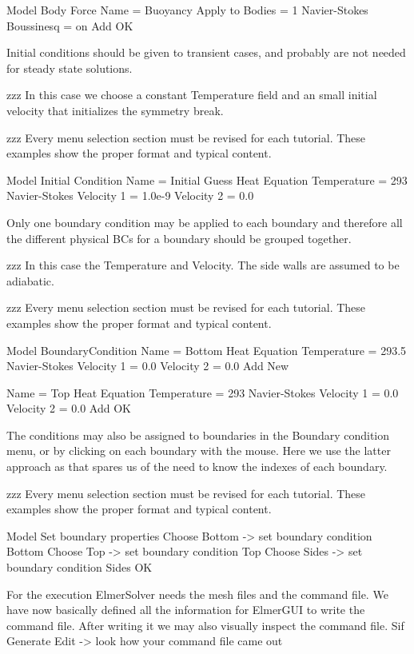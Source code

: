\ttbegin
Model
  Body Force
    Name = Buoyancy
    Apply to Bodies = 1
    Navier-Stokes
      Boussinesq = on
    Add 
    OK
\ttend    

Initial conditions should be given to transient cases, and probably are not needed for steady state solutions. 

zzz In this case we choose a constant Temperature field and an small initial velocity that initializes the symmetry break. 

zzz Every menu selection section must be revised for each tutorial.  These examples show the proper format and typical content.

\ttbegin
Model
  Initial Condition 
    Name = Initial Guess
    Heat Equation
      Temperature = 293
    Navier-Stokes
      Velocity 1 = 1.0e-9
      Velocity 2 = 0.0
\ttend

Only one boundary condition may be applied to each boundary and therefore all the different physical BCs for a boundary should be grouped together. 

zzz In this case the Temperature and Velocity. The side walls are assumed to be adiabatic.

zzz Every menu selection section must be revised for each tutorial.  These examples show the proper format and typical content.

\ttbegin
Model
  BoundaryCondition
    Name = Bottom
    Heat Equation
      Temperature = 293.5
    Navier-Stokes 
      Velocity 1 = 0.0
      Velocity 2 = 0.0
    Add
    New

    Name = Top
    Heat Equation
      Temperature = 293
    Navier-Stokes 
      Velocity 1 = 0.0
      Velocity 2 = 0.0
    Add
   OK 
\ttend   

The conditions may also be assigned to boundaries in the Boundary condition menu, or by clicking on each boundary with the mouse. Here we use the latter approach as that spares us of the need to know the indexes of each boundary.

zzz Every menu selection section must be revised for each tutorial.  These examples show the proper format and typical content.

\ttbegin
Model
  Set boundary properties
    Choose Bottom -> set boundary condition Bottom
    Choose Top -> set boundary condition Top
    Choose Sides -> set boundary condition Sides
   OK 
\ttend

For the execution ElmerSolver needs the mesh files and the command file.  We have now basically defined all the information for ElmerGUI to write the command file. After writing it we may also visually inspect the command file.
\ttbegin
Sif 
  Generate
  Edit -> look how your command file came out  
\ttend

